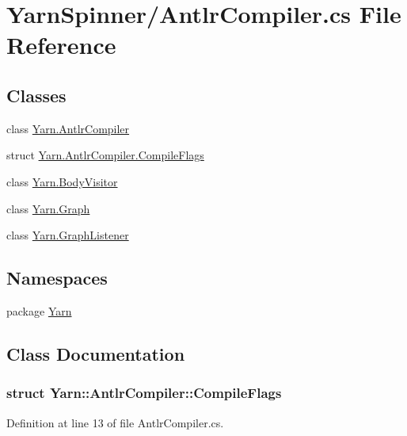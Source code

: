 \hypertarget{a00303}{\section{Yarn\-Spinner/\-Antlr\-Compiler.cs File Reference}
\label{a00303}
}
\subsection*{Classes}
\begin{DoxyCompactItemize}
\item 
class \hyperlink{a00038}{Yarn.\-Antlr\-Compiler}
\item 
struct \hyperlink{a00038_a00374}{Yarn.\-Antlr\-Compiler.\-Compile\-Flags}
\item 
class \hyperlink{a00044}{Yarn.\-Body\-Visitor}
\item 
class \hyperlink{a00108}{Yarn.\-Graph}
\item 
class \hyperlink{a00109}{Yarn.\-Graph\-Listener}
\end{DoxyCompactItemize}
\subsection*{Namespaces}
\begin{DoxyCompactItemize}
\item 
package \hyperlink{a00051}{Yarn}
\end{DoxyCompactItemize}


\subsection{Class Documentation}
\label{a00374}
\hypertarget{a00038_a00374}{}
\subsubsection{struct Yarn\-:\-:Antlr\-Compiler\-:\-:Compile\-Flags}


Definition at line 13 of file Antlr\-Compiler.\-cs.



